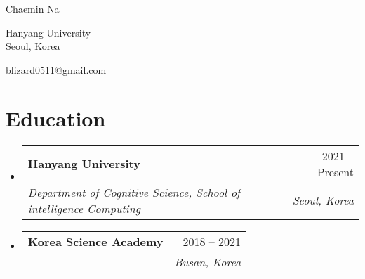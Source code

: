 \documentclass[letterpaper,11pt]{article}
\makeatletter
\newcommand{\resumeItem}[1]{
  \item{
    {#1 \vspace{-4pt}}
  }
}
\newcommand{\resumeSubheading}[4]{
  \vspace{-2pt}\item
    \begin{tabular*}{0.97\textwidth}[t]{l@{\extracolsep{\fill}}r}
      \textbf{#1} & #2 \\
      \textit{\small #3} & \textit{\small #4} \\
    \end{tabular*}\vspace{-10pt}
}
\newcommand{\resumeSubHeadingListStart}{\begin{itemize}[leftmargin=0.15in, label={}]}
\newcommand{\resumeSubHeadingListEnd}{\end{itemize}}
\newcommand{\resumeItemListStart}{\begin{itemize}}
\newcommand{\resumeItemListEnd}{\end{itemize}\vspace{-2pt}}
\makeatother
\begin{document}
\begin{center}
    {\LARGE Chaemin Na} \\ \vspace{0pt}
    \begin{multicols}{2}
    \begin{flushleft}
    \large{Hanyang University} \\
    \large{Seoul, Korea} \\
    \end{flushleft}
    
    \begin{flushright}
    \href{mailto:{your email adress}} \large{blizard0511@gmail.com}
    \end{flushright}
    \end{multicols}
\end{center}


\section{Education}
\resumeSubHeadingListStart

    \resumeSubheading
        {Hanyang University}{2021 -- Present}
        {Department of Cognitive Science, School of intelligence Computing}{Seoul, Korea}
      \resumeSubheading
        {Korea Science Academy}{2018 -- 2021}
        {}{Busan, Korea}

\resumeSubHeadingListEnd



\end{document}
